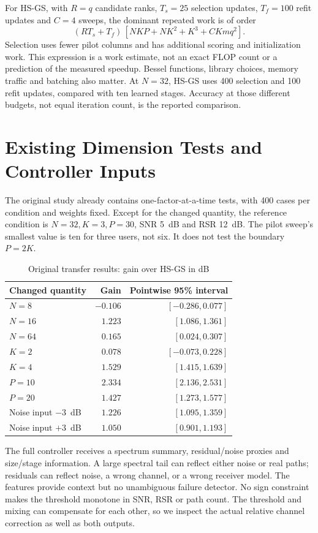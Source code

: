\documentclass[journal]{IEEEtran}
\begin{document}
For HS-GS, with $R=q$ candidate ranks, $T_s=25$ selection updates,
$T_f=100$ refit updates and $C=4$ sweeps, the dominant repeated work is
of order
\begin{equation}
 (RT_s+T_f)\,[NKP+NK^2+K^3+C Kmq^2].
\end{equation}
Selection uses fewer pilot columns and has additional scoring and
initialization work. This expression is a work estimate, not an exact
FLOP count or a prediction of the measured speedup. Bessel functions,
library choices, memory traffic and batching also matter. At $N=32$,
HS-GS uses 400 selection and 100 refit updates, compared with ten learned
stages. Accuracy at those different budgets, not equal iteration count,
is the reported comparison.

\section{Existing Dimension Tests and Controller Inputs}
The original study already contains one-factor-at-a-time tests, with 400
cases per condition and weights fixed. Except for the changed quantity,
the reference condition is $N=32,K=3,P=30$, SNR 5~dB and RSR 12~dB.
The pilot sweep's smallest value is ten for three users, not six.
It does not test the boundary $P=2K$.

\begin{table}[!t]
\caption{Original transfer results: gain over HS-GS in dB}
\centering\small
\begin{tabular}{@{}lrr@{}}\toprule
Changed quantity & Gain & Pointwise 95\% interval\\\midrule
$N=8$ & $-0.106$ & $[-0.286,0.077]$\\
$N=16$ & $1.223$ & $[1.086,1.361]$\\
$N=64$ & $0.165$ & $[0.024,0.307]$\\
$K=2$ & $0.078$ & $[-0.073,0.228]$\\
$K=4$ & $1.529$ & $[1.415,1.639]$\\
$P=10$ & $2.334$ & $[2.136,2.531]$\\
$P=20$ & $1.427$ & $[1.273,1.577]$\\
Noise input $-3$~dB & $1.226$ & $[1.095,1.359]$\\
Noise input $+3$~dB & $1.050$ & $[0.901,1.193]$\\\bottomrule
\end{tabular}
\end{table}

The full controller receives a spectrum summary, residual/noise proxies
and size/stage information. A large spectral tail can reflect either noise
or real paths; residuals can reflect noise, a wrong channel, or a wrong
receiver model. The features provide context but no unambiguous failure
detector. No sign constraint makes the threshold monotone in SNR, RSR or
path count. The threshold and mixing can compensate for each other, so
we inspect the actual relative channel correction as well as both outputs.
\end{document}
